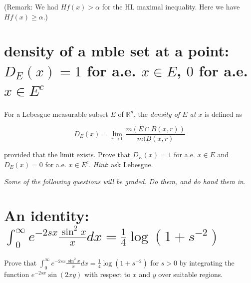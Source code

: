 (Remark: We had \(Hf(x) > \alpha\) for the HL maximal inequality. Here we have \(Hf(x) \geq \alpha\).)

\section{\texorpdfstring{density of a mble set at a point: \(D_{E}(x) = 1\) for a.e. \(x \in E\), \(0\) for a.e. \(x \in E^{c}\)}{density of a mble set at a point: D\_\{E\}(x) = 1 for a.e. x \textbackslash in E, 0 for a.e. x \textbackslash in E\^{}\{c\}}}

For a Lebesgue measurable subset \(E\) of \(\mathbb{R}^{n}\), the \emph{density of \(E\) at \(x\)} is defined as

\[D_{E}(x) = \lim\limits_{r\rightarrow 0}\frac{m(E \cap B(x,r))}{m(B(x,r)}\]

provided that the limit exists. Prove that \(D_{E}(x) = 1\) for a.e. \(x \in E\) and \(D_{E}(x) = 0\) for a.e. \(x \in E^{c}\). \emph{Hint}: ask Lebesgue.

\emph{Some of the following questions will be graded. Do them, and do hand them in}.

\section{\texorpdfstring{An identity: \(\int_{0}^{\infty}e^{- 2sx}\frac{\sin^{2}x}{x} dx = \frac{1}{4}\log(1 + s^{- 2})\)}{An identity: \textbackslash int\_\{0\}\^{}\{\textbackslash infty\}e\^{}\{- 2sx\}\textbackslash frac\{\textbackslash sin\^{}\{2\}x\}\{x\} dx = \textbackslash frac\{1\}\{4\}\textbackslash log(1 + s\^{}\{- 2\})}}\label{an-identity-int_0infty-e-2sxfracsin2xxd-xfrac14log1s-2}

Prove that \(\int_{0}^{\infty}e^{- 2sx}\frac{\sin^{2}x}{x} dx = \frac{1}{4}\log(1 + s^{- 2})\) for \(s > 0\) by integrating the function \(e^{- 2sx}\sin(2xy)\) with respect to \(x\) and \(y\) over suitable regions.

